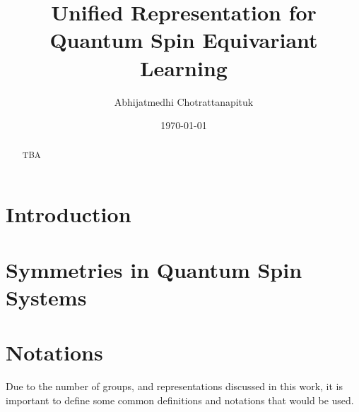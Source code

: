 \documentclass[preprint, 12pt]{revtex4-2}
\numberwithin{equation}{section}
\begin{document}
\title{Unified Representation for Quantum Spin Equivariant Learning}

\author{Abhijatmedhi Chotrattanapituk}

\date{\today}

\begin{abstract}
    TBA
\end{abstract}

\maketitle
\newpage

\section{Introduction}

\section{Symmetries in Quantum Spin Systems}

\section{Notations}
Due to the number of groups, and representations discussed in this work, it is important to define some common definitions and notations that would be used. 
\end{document}
